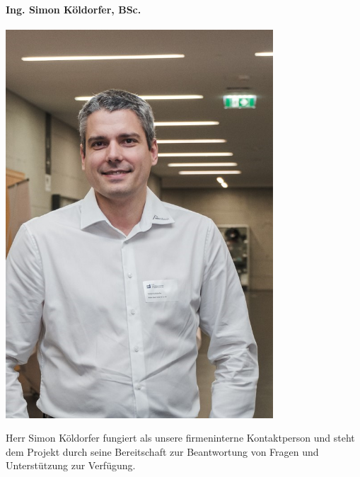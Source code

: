 \paragraph{Ing. Simon Köldorfer, BSc.}
\begin{minipage}{0.37\textwidth}
	\centering
	\includegraphics[width=0.75\textwidth]{Bilder/Personen/koeldorfer}
\end{minipage}
\hfill
\begin{minipage}{0.6\textwidth}
    Herr Simon Köldorfer fungiert als unsere firmeninterne Kontaktperson und steht dem Projekt durch seine Bereitschaft zur Beantwortung von Fragen und Unterstützung zur Verfügung.
\end{minipage}%
\vspace{1ex}